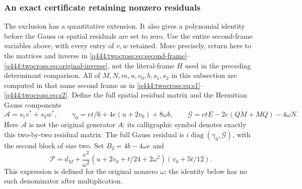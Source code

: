 \subsubsection{An exact certificate retaining nonzero residuals}
\label{q444:twocross:quantitative-section}

The exclusion has a quantitative extension. It also gives a polynomial
identity before the Gauss or spatial residuals are set to zero. Use the
entire second-frame variables above, with every entry of $v,w$ retained.
More precisely, return here to the matrices and inverse in
\eqref{q444:twocross:eq:second-frame}--\eqref{q444:twocross:eq:original-inverse},
not the literal-frame $H$ used in the preceding determinant comparison.
All of $M,N,m,u,v_0,b,s_1,s_2$ in this subsection are computed in
that same second frame as in \eqref{q444:twocross:eq:s1}--\eqref{q444:twocross:eq:s2}.
Define the full spatial residual matrix and the Hermitian Gauss components
\[
 \mathcal A=s_1v^*+s_2w^*,\qquad
 \gamma_0=et/6+4e(u+2v_0)+8\omega b,
 \qquad \mathcal G=etE-2e(QM+MQ)-4\omega N.
\]
Here $\mathcal A$ is not the original generator $A$: its calligraphic
symbol denotes exactly this two-by-two residual matrix. The full Gauss
residual is $i\operatorname{diag}(\gamma_0,\mathcal G)$, with the
second block of size two. Set $B_2=4b-4\omega e$ and
\[
 \mathcal P=d_M+\frac{e^2}{\omega^2}
       (u+2v_0+t/24+2\omega^2)(v_0+5t/12).
\]
This expression is defined for the original nonzero $\omega$; the
identity below has no such denominator after multiplication.

